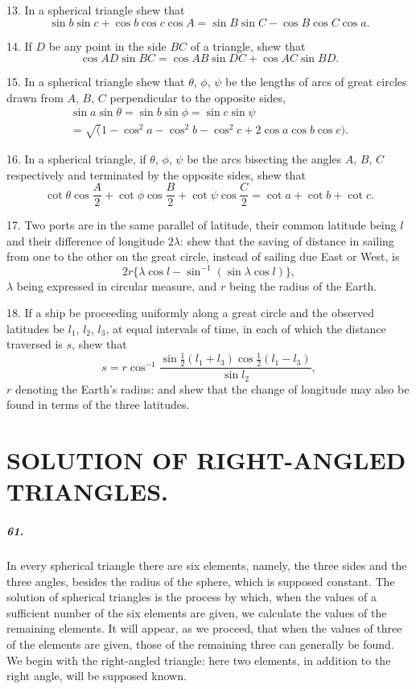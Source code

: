 \documentclass{book}[2004/02/16]
\begin{document}
\begin{mainmatter}
\begin{spacing}{1.3}
13. In a spherical triangle shew that
\[
\sin b \sin c + \cos b \cos c \cos A =
\sin B \sin C - \cos B \cos C \cos a.
\]

14. If $D$ be any point in the side $BC$ of a triangle, shew that
\[
\cos AD \sin BC = \cos AB \sin DC + \cos AC \sin BD.
\]

15. In a spherical triangle shew that $\theta$, $\phi$, $\psi$ be the lengths
of arcs of great circles drawn from $A$, $B$, $C$ perpendicular to the
opposite sides,
\begin{gather*}
  \sin a \sin \theta =
  \sin b \sin \phi =
  \sin c \sin \psi \\
= \surd(1 - \cos^2 a - \cos^2 b - \cos^2 c + 2 \cos a \cos b \cos c).
\end{gather*}

16. In a spherical triangle, if $\theta$, $\phi$, $\psi$ be the arcs bisecting the
angles $A$, $B$, $C$ respectively and terminated by the opposite sides,
shew that
\[
  \cot\theta\cos\dfrac A2 +
  \cot\phi  \cos\dfrac B2 +
  \cot\psi  \cos\dfrac C2 =
  \cot a + \cot b + \cot c.
\]

17. Two ports are in the same parallel of latitude, their common
latitude being $l$ and their difference of longitude $2\lambda$: shew
that the saving of distance in sailing from one to the other on the
great circle, instead of sailing due East or West, is
\[
  2r\{\lambda \cos l - \sin^{-1}(\sin \lambda \cos l)\},
\]
$\lambda$ being expressed in circular measure, and $r$ being the radius of
the Earth.
\medskip

18. If a ship be proceeding uniformly along a great circle and
the observed latitudes be $l_1$, $l_2$, $l_3$, at equal intervals of time, in
each of which the distance traversed is $s$, shew that
\[
  s = r\cos^{-1}
      \frac{\sin\tfrac 12(l_1 + l_3)\cos\tfrac 12(l_1 - l_3)}
           {\sin l_2},
\]
$r$ denoting the Earth's radius: and shew that the change of longitude
may also be found in terms of the three latitudes.

\chapter[Solution of Right-angled Triangles.]{SOLUTION OF RIGHT-ANGLED TRIANGLES.}

\paragraph{61.} In every spherical triangle there are six elements, namely,
the three sides and the three angles, besides the radius of the
sphere, which is supposed constant. The solution of spherical triangles
is the process by which, when the values of a sufficient
number of the six elements are given, we calculate the values of
the remaining elements. It will appear, as we proceed, that when
the values of three of the elements are given, those of the remaining
three can generally be found. We begin with the right-angled
triangle: here two elements, in addition to the right angle, will be
supposed known.


\end{spacing}
\end{mainmatter}
\end{document}
